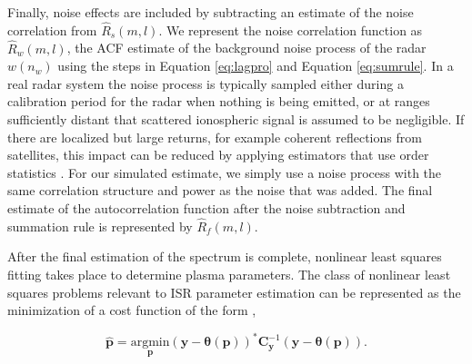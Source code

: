 \documentclass[draft,ras]{agutex}
\newcommand{\pcom}[2]{\marginpar{{\footnotesize \bf #1}}{\it {#2}}}
\begin{document}
\begin{article}

Finally, noise effects are included by subtracting an estimate of the noise correlation from $\widehat{R}_s(m,l)$.  We represent the noise correlation function as $\widehat{R}_w(m,l)$, the ACF estimate of the background noise process of the radar $w(n_w)$ using the steps in Equation \ref{eq:lagpro} and Equation \ref{eq:sumrule}. In a real radar system the noise process is typically sampled either during a calibration period for the radar when nothing is being emitted, or at ranges sufficiently distant that scattered ionospheric signal is assumed to be negligible. If there are localized but large returns, for example coherent reflections from satellites, this impact can be reduced by applying estimators that use order statistics \citep{ordstatcfar}. For our simulated estimate, we simply use a noise process with the same correlation structure and power as the noise that was added. The final estimate of the autocorrelation function after the noise subtraction and summation rule is represented by $\widehat{R}_f(m,l)$. 


After the final estimation of the spectrum is complete, nonlinear least squares fitting takes place to determine plasma parameters.  
The class of nonlinear least squares problems relevant to ISR parameter estimation can be represented as the minimization of a cost function of the form \citep{kayvol1},

\begin{equation}
	\mathbf{\hat{p}}= \underset{\mathbf{p}}{\text{argmin}} (\mathbf{y}-\bm{\theta}(\mathbf{p}))^*\mathbf{C}_{\mathbf{y}}^{-1}(\mathbf{y}-\bm{\theta}(\mathbf{p})).
\label{nlls}
\end{equation}


\end{article}
\end{document}
